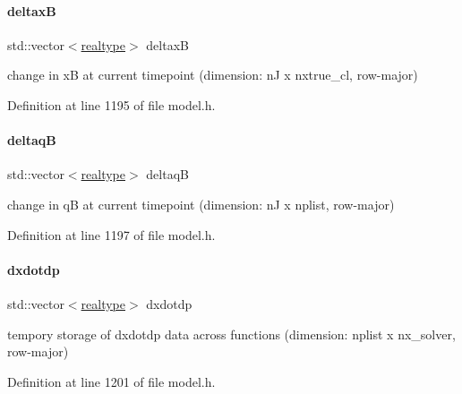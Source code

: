 \mbox{\label{classamici_1_1_model_ad849fbfc7f8089c1a98ab6ac5ba96861}} 
\paragraph{\texorpdfstring{deltaxB}{deltaxB}}
{\footnotesize\ttfamily std\+::vector$<$\mbox{\hyperlink{namespaceamici_a1bdce28051d6a53868f7ccbf5f2c14a3}{realtype}}$>$ deltaxB}

change in xB at current timepoint (dimension\+: nJ x nxtrue\+\_\+cl, row-\/major) 

Definition at line 1195 of file model.\+h.

\mbox{\label{classamici_1_1_model_a1389b2fb29c46c42f7c24b4d5972af7a}} 
\paragraph{\texorpdfstring{deltaqB}{deltaqB}}
{\footnotesize\ttfamily std\+::vector$<$\mbox{\hyperlink{namespaceamici_a1bdce28051d6a53868f7ccbf5f2c14a3}{realtype}}$>$ deltaqB}

change in qB at current timepoint (dimension\+: nJ x nplist, row-\/major) 

Definition at line 1197 of file model.\+h.

\mbox{\label{classamici_1_1_model_adba071f2419937047304600d4dad9b04}} 
\paragraph{\texorpdfstring{dxdotdp}{dxdotdp}}
{\footnotesize\ttfamily std\+::vector$<$\mbox{\hyperlink{namespaceamici_a1bdce28051d6a53868f7ccbf5f2c14a3}{realtype}}$>$ dxdotdp}

tempory storage of dxdotdp data across functions (dimension\+: nplist x nx\+\_\+solver, row-\/major) 

Definition at line 1201 of file model.\+h.

\mbox{\label{classamici_1_1_model_a23d87dde1f3cedfdd1a5b1e703e381ad}} 
